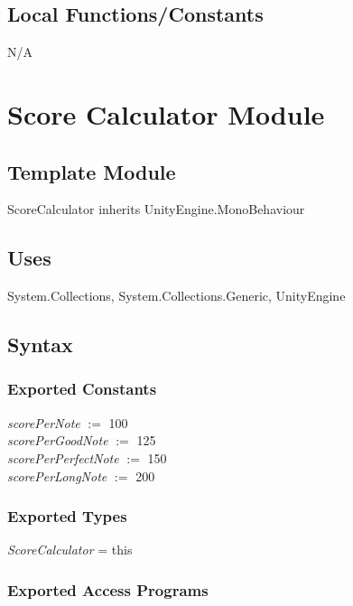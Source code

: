 \documentclass[12pt]{article}
\begin{document}
\subsection{Local Functions/Constants}
N/A

\medskip

\newpage
\section{Score Calculator Module}

\subsection{Template Module}
ScoreCalculator inherits UnityEngine.MonoBehaviour

\subsection {Uses}
System.Collections, System.Collections.Generic, UnityEngine

\subsection {Syntax}

\subsubsection {Exported Constants}
\textit{scorePerNote} $:=$ 100\\
\textit{scorePerGoodNote} $:=$ 125\\
\textit{scorePerPerfectNote} $:=$ 150\\
\textit{scorePerLongNote} $:=$ 200

\subsubsection {Exported Types}
\textit{ScoreCalculator} = this

\subsubsection {Exported Access Programs}
\end{document}
